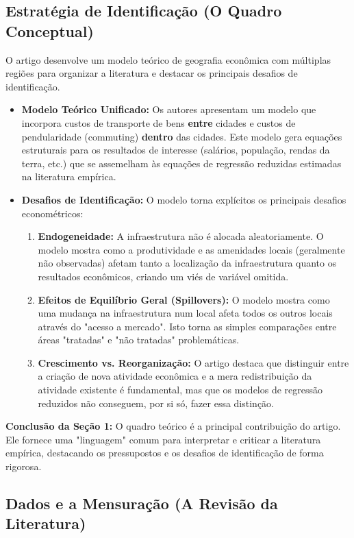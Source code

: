\documentclass[12pt, a4paper]{article}
\begin{document}
\subsection{Estratégia de Identificação (O Quadro Conceptual)}
O artigo desenvolve um modelo teórico de geografia econômica com múltiplas regiões para organizar a literatura e destacar os principais desafios de identificação.

\begin{itemize}
    \item \textbf{Modelo Teórico Unificado:} Os autores apresentam um modelo que incorpora custos de transporte de bens \textbf{entre} cidades e custos de pendularidade (commuting) \textbf{dentro} das cidades. Este modelo gera equações estruturais para os resultados de interesse (salários, população, rendas da terra, etc.) que se assemelham às equações de regressão reduzidas estimadas na literatura empírica.
    \item \textbf{Desafios de Identificação:} O modelo torna explícitos os principais desafios econométricos:
        \begin{enumerate}
            \item \textbf{Endogeneidade:} A infraestrutura não é alocada aleatoriamente. O modelo mostra como a produtividade e as amenidades locais (geralmente não observadas) afetam tanto a localização da infraestrutura quanto os resultados econômicos, criando um viés de variável omitida.
            \item \textbf{Efeitos de Equilíbrio Geral (Spillovers):} O modelo mostra como uma mudança na infraestrutura num local afeta todos os outros locais através do "acesso a mercado". Isto torna as simples comparações entre áreas "tratadas" e "não tratadas" problemáticas.
            \item \textbf{Crescimento vs. Reorganização:} O artigo destaca que distinguir entre a criação de nova atividade econômica e a mera redistribuição da atividade existente é fundamental, mas que os modelos de regressão reduzidos não conseguem, por si só, fazer essa distinção.
        \end{enumerate}
\end{itemize}

\noindent\textbf{Conclusão da Seção 1:} O quadro teórico é a principal contribuição do artigo. Ele fornece uma "linguagem" comum para interpretar e criticar a literatura empírica, destacando os pressupostos e os desafios de identificação de forma rigorosa.

\subsection{Dados e a Mensuração (A Revisão da Literatura)}
\end{document}
